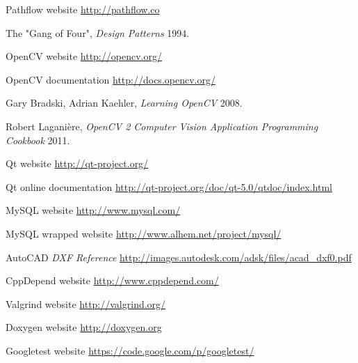 \begin{thebibliography}{1}

 Pathflow website \url{http://pathflow.co}

 The "Gang of Four", \textit{Design Patterns} 1994.

 OpenCV website \url{http://opencv.org/}

 OpenCV documentation \url{http://docs.opencv.org/}

 Gary Bradski, Adrian Kaehler, {\em Learning OpenCV} 2008.

 Robert Laganière, {\em OpenCV 2 Computer Vision Application Programming Cookbook} 2011.

 Qt website \url{http://qt-project.org/}

 Qt online documentation \url{http://qt-project.org/doc/qt-5.0/qtdoc/index.html}

 MySQL website \url{http://www.mysql.com/}

 MySQL wrapped website \url{http://www.alhem.net/project/mysql/}

 AutoCAD {\em DXF Reference} \url{http://images.autodesk.com/adsk/files/acad_dxf0.pdf}

 CppDepend website \url{http://www.cppdepend.com/}

 Valgrind website \url{http://valgrind.org/}

 Doxygen website \url{http://doxygen.org}

 Googletest website \url{https://code.google.com/p/googletest/}

\end{thebibliography}